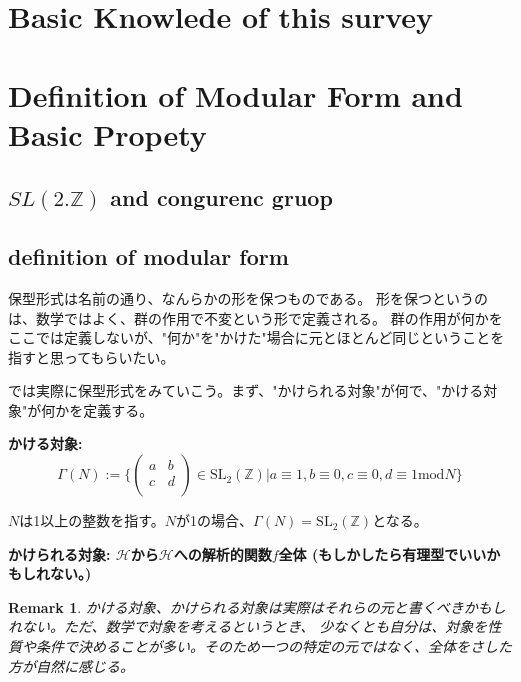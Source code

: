 \documentclass{ujarticle}
\newtheorem*{rem}{Remark}
\begin{document}
\section{Basic Knowlede of this survey}
\label{sec:Basic Knowlede of this survey}


\section{Definition of Modular Form and Basic Propety}
\label{sec:Modular Form}

\subsection{$SL(2.\mathbb{Z})$ and congurenc gruop}
\label{sub:$SL(2.Z and congurenc gruop}


\subsection{definition of modular form}
\label{sub:definition of modular form}
保型形式は名前の通り、なんらかの形を保つものである。
形を保つというのは、数学ではよく、群の作用で不変という形で定義される。
群の作用が何かをここでは定義しないが、"何か"を"かけた"場合に元とほとんど同じということを指すと思ってもらいたい。

\noindent では実際に保型形式をみていこう。まず、"かけられる対象"が何で、"かける対象"が何かを定義する。

\noindent \bf{かける対象:}
\begin{equation*}
  \Gamma(N) := \{
  \begin{pmatrix}
    a & b \\
    c & d \\
  \end{pmatrix}
  \in \mathrm{SL}_2(\mathbb{Z}) | a \equiv 1,b \equiv 0,c \equiv 0, d \equiv 1 \mathrm{mod} N
  \}
\end{equation*}
\begin{center}
  $N$は1以上の整数を指す。$N$が1の場合、$\Gamma(N) = \mathrm{SL_2(\mathbb{Z})}$となる。
\end{center}

\noindent \bf{かけられる対象:}
$\mathcal{H}$から$\mathcal{H}$への解析的関数$f$全体
(もしかしたら有理型でいいかもしれない。)
\begin{rem}
  かける対象、かけられる対象は実際はそれらの元と書くべきかもしれない。ただ、数学で対象を考えるというとき、
  少なくとも自分は、対象を性質や条件で決めることが多い。そのため一つの特定の元ではなく、全体をさした方が自然に感じる。
\end{rem}
\end{document}
